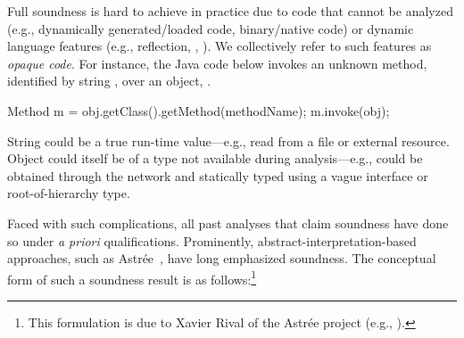 Full soundness is hard to achieve in practice due to code that cannot
be analyzed (e.g., dynamically generated/loaded code, binary/native
code) or dynamic language features (e.g., reflection, ,
). We collectively refer to such features as
\emph{opaque code}. For instance, the Java code below invokes an
unknown method, identified by string , over an
object, .

\vspace{-3mm}\begin{minipage}[l]{5.1in}
\begin{javacodeNoLines}
Method m = obj.getClass().getMethod(methodName);
m.invoke(obj);  
\end{javacodeNoLines}
\end{minipage}

\noindent String  could be a true run-time value---e.g., read
from a file or external resource. Object  could itself be of a
type not available during analysis---e.g.,  could be obtained
through the network and statically typed using a vague interface or
root-of-hierarchy type.



Faced with such complications, all past analyses that claim soundness
have done so under \emph{a priori} qualifications. Prominently,
abstract-interpretation-based~\cite{Cousot:1977:AIU:512950.512973}
approaches, such as Astr\'{e}e~\cite{Delmas2007}, have long emphasized
soundness. The conceptual form of such a soundness result is as
follows:\footnote{This formulation is due to Xavier Rival of the Astr\'{e}e project
  (e.g., \cite{www:soundness-xavier}).}

